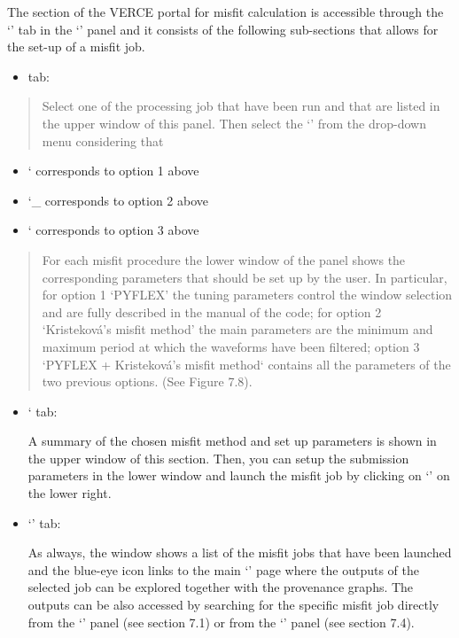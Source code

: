 \documentclass[english]{book}
\begin{document}
The section of the VERCE portal for misfit calculation is accessible
through the ‘’ tab in the ‘’ panel
and it consists of the following sub-sections that allows for the set-up
of a misfit job.
\begin{itemize}
\item {} 
 tab:

\end{itemize}
\begin{quote}

Select one of the processing job that have been run and that are listed
in the upper window of this panel. Then select the ‘’
from the drop-down menu considering that
\end{quote}
\begin{itemize}
\item {} 
‘ corresponds to option 1 above

\item {} 
‘\_ corresponds to option 2 above

\item {} 
‘ corresponds to option 3 above

\end{itemize}
\begin{quote}

For each misfit procedure the lower window of the panel shows the
corresponding parameters that should be set up by the user. In
particular, for option 1 \textendash{} ‘PYFLEX’ the tuning parameters control
the window selection and are fully described in the manual of the
code; for option 2 \textendash{} ‘Kristeková’s misfit method’ the main
parameters are the minimum and maximum period at which the waveforms
have been filtered; option 3 \textendash{} ‘PYFLEX + Kristeková’s misfit method‘
contains all the parameters of the two previous options. (See Figure 7.8).
\end{quote}
\begin{itemize}
\item {} 
‘ tab:

A summary of the chosen misfit method and set up parameters is shown in the upper window of this section. Then, you can setup the submission
parameters in the lower window and launch the misfit job by clicking on ‘’ on the lower right.

\item {} 
‘’ tab:

As always, the window shows a list of the misfit jobs that have been
launched and the blue-eye icon links to the main ‘’ page
where the outputs of the selected job can be explored together with the
provenance graphs. The outputs can be also accessed by searching for the
specific misfit job directly from the ‘’ panel (see section
7.1) or from the ‘’ panel (see section 7.4).

\end{itemize}
\end{document}
